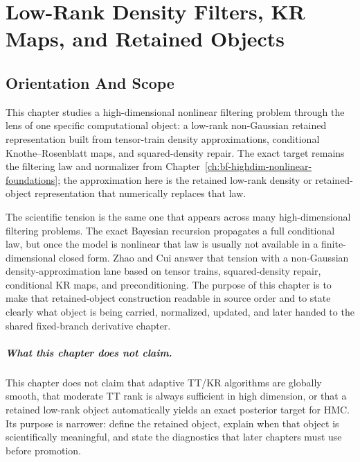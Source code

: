 \chapter{Low-Rank Density Filters, KR Maps, and Retained Objects}
\label{ch:bf-highdim-low-rank-density-kr}
\label{ch:bf-highdim-particle-transport-tensor}
\label{prop:bf-hd-corrected-proposal}

\section{Orientation And Scope}
\label{sec:bf-hd-ttkr-purpose}

This chapter studies a high-dimensional nonlinear filtering problem through the
lens of one specific computational object: a low-rank non-Gaussian retained
representation built from tensor-train density approximations, conditional
Knothe--Rosenblatt maps, and squared-density repair.  The exact target remains
the filtering law and normalizer from
Chapter~\ref{ch:bf-highdim-nonlinear-foundations}; the approximation here is the
retained low-rank density or retained-object representation that numerically
replaces that law.

The scientific tension is the same one that appears across many high-dimensional
filtering problems.  The exact Bayesian recursion propagates a full conditional
law, but once the model is nonlinear that law is usually not available in a
finite-dimensional closed form.  Zhao and Cui answer that tension with a
non-Gaussian density-approximation lane based on tensor trains,
squared-density repair, conditional KR maps, and preconditioning.  The purpose
of this chapter is to make that retained-object construction readable in source
order and to state clearly what object is being carried, normalized, updated,
and later handed to the shared fixed-branch derivative chapter.

\paragraph{What this chapter does not claim.}
This chapter does not claim that adaptive TT/KR algorithms are globally smooth,
that moderate TT rank is always sufficient in high dimension, or that a retained
low-rank object automatically yields an exact posterior target for HMC.  Its
purpose is narrower: define the retained object, explain when that object is
scientifically meaningful, and state the diagnostics that later chapters must use
before promotion.

